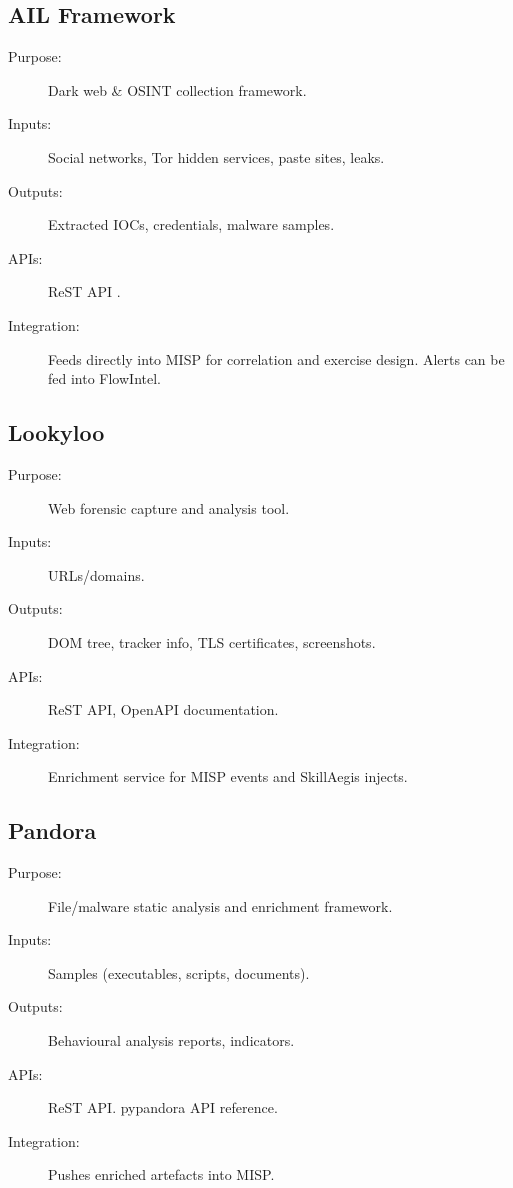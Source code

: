 \documentclass[10pt,a4paper]{report}
\begin{document}
\subsection{AIL Framework}
\begin{description}
  \item[Purpose:] Dark web \& OSINT collection framework.
  \item[Inputs:] Social networks, Tor hidden services, paste sites, leaks.
  \item[Outputs:] Extracted IOCs, credentials, malware samples.
  \item[APIs:] ReST API \cite{aopenapi}.
  \item[Integration:] Feeds directly into MISP for correlation and exercise
  design. Alerts can be fed into FlowIntel.
\end{description}

\subsection{Lookyloo}
\begin{description}
  \item[Purpose:] Web forensic capture and analysis tool.
  \item[Inputs:] URLs/domains.
  \item[Outputs:] DOM tree, tracker info, TLS certificates, screenshots.
  \item[APIs:] ReST API, OpenAPI documentation. \cite{lopenapi}
  \item[Integration:] Enrichment service for MISP events and SkillAegis
  injects.
\end{description}

\subsection{Pandora}
\begin{description}
  \item[Purpose:] File/malware static analysis and enrichment framework.
  \item[Inputs:] Samples (executables, scripts, documents).
  \item[Outputs:] Behavioural analysis reports, indicators.
  \item[APIs:] ReST API\cite{pandora}. pypandora API reference\cite{papi}.
  \item[Integration:] Pushes enriched artefacts into MISP.
\end{description}
\end{document}
